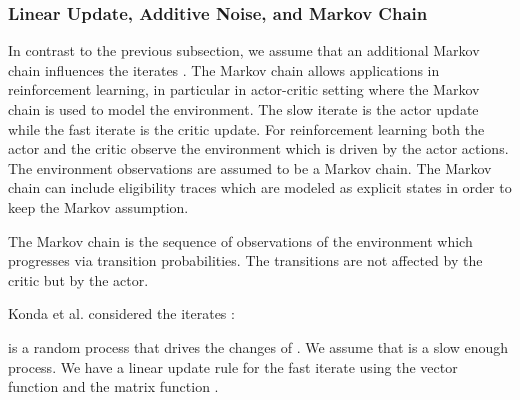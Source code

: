 \documentclass{article}
\begin{document}
\subsubsection{Linear Update, Additive Noise, and Markov Chain}
\label{sec:linupnoisemc}

In contrast to the previous subsection, we assume that an additional Markov
chain influences the iterates \cite{Konda:02,Konda:03}.
The Markov chain allows applications in reinforcement learning, in
particular in actor-critic setting where the Markov chain is used to
model the environment. The slow iterate is the actor
update while the fast iterate is the critic update.
For reinforcement learning both the actor and the critic observe the
environment which is driven by the actor actions. The environment
observations are assumed to be a Markov chain. The Markov chain can
include eligibility traces which are modeled as explicit states in
order to keep the Markov assumption.

The Markov chain is the sequence of observations of the environment
which progresses via transition probabilities.
The transitions are not affected by the critic but
by the actor.


Konda et al. considered the iterates \cite{Konda:02,Konda:03}:

 is a random process that drives the changes of
. We assume that  is a slow enough process.
We have a linear update rule for the fast iterate using
the vector function  and
the matrix function .
\end{document}
